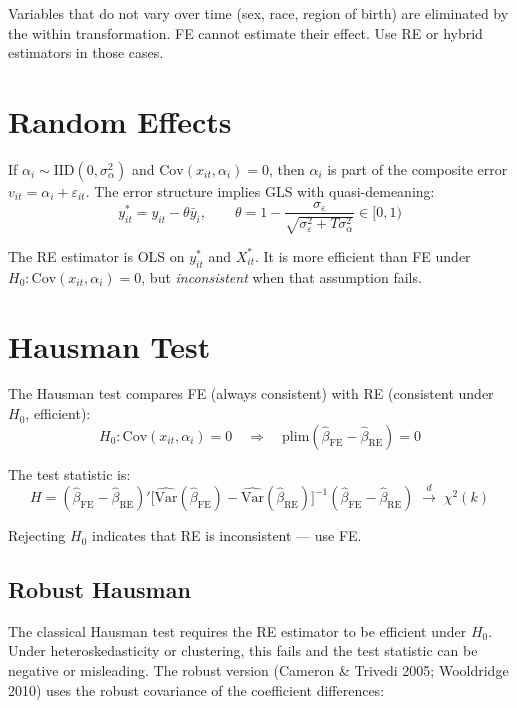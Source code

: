 \begin{aviso}
  Variables that do not vary over time (sex, race, region of birth) are
  eliminated by the within transformation. FE cannot estimate their effect.
  Use RE or hybrid estimators in those cases.
\end{aviso}

\section{Random Effects}

If $\alpha_i \sim \mathrm{IID}(0, \sigma^2_\alpha)$ and
$\mathrm{Cov}(x_{it}, \alpha_i) = 0$, then $\alpha_i$ is part of the composite error
$v_{it} = \alpha_i + \varepsilon_{it}$. The error structure implies GLS with
quasi-demeaning:
\[
  y^*_{it} = y_{it} - \theta\bar{y}_i,
  \qquad
  \theta = 1 - \frac{\sigma_\varepsilon}{\sqrt{\sigma^2_\varepsilon + T\sigma^2_\alpha}}
  \in [0,1)
\]

The RE estimator is OLS on $y^*_{it}$ and $X^*_{it}$. It is more efficient than
FE under $H_0: \mathrm{Cov}(x_{it},\alpha_i) = 0$, but \emph{inconsistent}
when that assumption fails.

\section{Hausman Test}

The Hausman test compares FE (always consistent) with RE (consistent under
$H_0$, efficient):
\[
  H_0: \mathrm{Cov}(x_{it}, \alpha_i) = 0
  \quad\Longrightarrow\quad
  \mathrm{plim}(\hat\beta_{\mathrm{FE}} - \hat\beta_{\mathrm{RE}}) = 0
\]

The test statistic is:
\[
  H = (\hat\beta_{\mathrm{FE}} - \hat\beta_{\mathrm{RE}})'
      \bigl[\widehat{\mathrm{Var}}(\hat\beta_{\mathrm{FE}}) -
             \widehat{\mathrm{Var}}(\hat\beta_{\mathrm{RE}})\bigr]^{-1}
      (\hat\beta_{\mathrm{FE}} - \hat\beta_{\mathrm{RE}})
  \;\xrightarrow{d}\; \chi^2(k)
\]

Rejecting $H_0$ indicates that RE is inconsistent --- use FE.

\subsection{Robust Hausman}

The classical Hausman test requires the RE estimator to be efficient
under $H_0$. Under heteroskedasticity or clustering, this fails and the
test statistic can be negative or misleading. The robust version
(Cameron \& Trivedi 2005; Wooldridge 2010) uses the robust covariance
of the coefficient differences:

